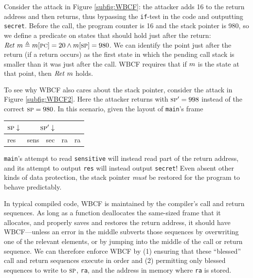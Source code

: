 \documentclass[10pt,conference]{ieeetran}%
\theoremstyle{definition}
\begin{document}
Consider the attack in Figure \ref{subfig:WBCF}: the attacker adds
16 to the return address and then returns, thus bypassing the {\tt if}-test in the code and outputting
{\tt secret}. Before the call, the program counter is 16 and the stack pointer is 980,
so we define a predicate on states that should hold just after the return:
\(\ret\ \mach \triangleq \mach[\PCname] = 20 \wedge \mach[\SP] = 980\).
%
We can identify the point just after the return (if a return occurs)
as the first state in which the pending call stack is smaller than it was
just after the call.
WBCF requires that if \(m\) is the state at that point, then \(\mathit{Ret} ~ m\) holds.

To see why WBCF also cares about the stack pointer, consider the attack in
Figure \ref{subfig:WBCF2}. Here the attacker returns with \(\textsc{sp}' = 998\) instead of the
correct \(\textsc{sp} = 980\). In this scenario, given the layout of {\tt main}'s frame 
\begin{tabular}{| l | l | l | l | l |}
  \multicolumn{1}{r}{\(\textsc{sp} \downarrow\)} &
  \multicolumn{2}{r}{\(\textsc{sp}' \downarrow\)} \\
  \hline
  res & sens & sec & ra & ra \\
  \hline
\end{tabular}

\vspace{\abovedisplayskip}

\noindent
{\tt main}'s attempt to read {\tt sensitive} will instead 
read part of the return address, and its attempt to output
{\tt res} will instead output {\tt secret}! Even absent other
kinds of data protection, the stack pointer {\it must} be restored
for the program to behave predictably.

In typical compiled code, WBCF is maintained by the compiler's call and return sequences.
As long as a function deallocates the same-sized frame that it allocates, and properly
saves and restores the return address, it should have WBCF---unless an error in the middle
subverts those sequences by overwriting one of the relevant elements, or by jumping into
the middle of the call or return sequence. We can therefore enforce WBCF by (1) ensuring that
these ``blessed'' call and return sequences execute in order and (2) permitting only blessed
sequences to write to \(\textsc{sp}\), {\tt ra}, and the address in memory where {\tt ra} is stored.
\end{document}
